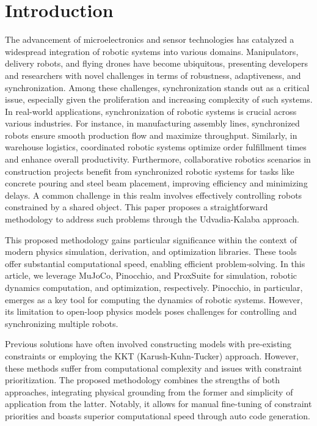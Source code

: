 \chapter{Introduction}
\label{chap:intro}

The advancement of microelectronics and sensor technologies has catalyzed a 
widespread integration of robotic systems into various domains. Manipulators, 
delivery robots, and flying drones have become ubiquitous, presenting developers 
and researchers with novel challenges in terms of robustness, adaptiveness, and 
synchronization. Among these challenges, synchronization stands out as a critical 
issue, especially given the proliferation and increasing complexity of such systems. 
 In real-world applications, synchronization of robotic systems is crucial across 
various industries. For instance, in manufacturing assembly lines, synchronized 
robots ensure smooth production flow and maximize throughput. Similarly, in 
warehouse logistics, coordinated robotic systems optimize order fulfillment times 
and enhance overall productivity. Furthermore, collaborative robotics scenarios in 
construction projects benefit from synchronized robotic systems for tasks like 
concrete pouring and steel beam placement, improving efficiency and minimizing 
delays. A common challenge in this realm involves effectively controlling robots constrained 
by a shared object. This paper proposes a straightforward methodology to address 
such problems through the Udvadia-Kalaba\cite{UdwadiaKalabaApproach} approach.

This proposed methodology gains particular significance within the context of modern 
physics simulation, derivation, and optimization libraries. These tools offer 
substantial computational speed, enabling efficient problem-solving. In this article, 
we leverage MuJoCo\cite{MuJoCo}, Pinocchio\cite{Pinocchio}, and ProxSuite\cite{CvxPy} 
for simulation, robotic dynamics computation, and optimization, respectively. 
Pinocchio, in particular, emerges as a key tool for computing the dynamics of robotic 
systems. However, its limitation to open-loop physics models poses challenges for 
controlling and synchronizing multiple robots.

Previous solutions have often involved constructing models with pre-existing 
constraints or employing the KKT (Karush-Kuhn-Tucker) approach. However, these 
methods suffer from computational complexity and issues with constraint 
prioritization. The proposed methodology combines the strengths of both approaches, 
integrating physical grounding from the former and simplicity of application from 
the latter. Notably, it allows for manual fine-tuning of constraint priorities and 
boasts superior computational speed through auto code generation. 

